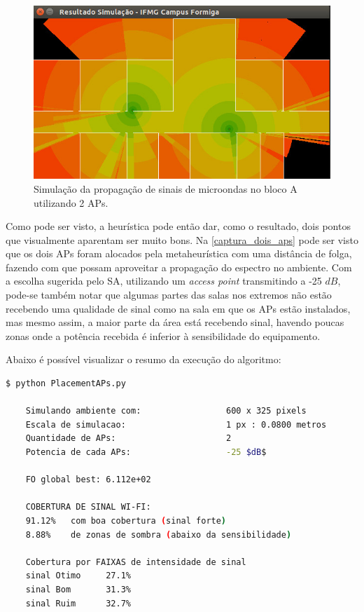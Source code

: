 \documentclass[
	12pt,				%
	twoside,			%
	a4paper,			%
	english,			%
	french,				%
	spanish,			%
	brazil				%
	]{abntex2}
\begin{document}
\begin{figure}[ht]
    \caption{\label{captura_dois_aps} Simulação da propagação de sinais de microondas no bloco A utilizando 2 APs.
    }
    \begin{center}
        \includegraphics[scale=0.6]{imagens/captura-2-aps-2.jpg}
    \end{center}
\end{figure}

Como pode ser visto, a heurística pode então dar, como o resultado, dois
pontos que visualmente aparentam ser muito bons. Na
\autoref{captura_dois_aps} pode ser visto que os dois APs foram alocados
pela metaheurística com uma distância de folga, fazendo com que possam
aproveitar a propagação do espectro no ambiente. Com a escolha sugerida
pelo SA, utilizando um \emph{access point} transmitindo a -25 \(dB\),
pode-se também notar que algumas partes das salas nos extremos não estão
recebendo uma qualidade de sinal como na sala em que os APs estão
instalados, mas mesmo assim, a maior parte da área está recebendo sinal,
havendo poucas zonas onde a potência recebida é inferior à sensibilidade
do equipamento.

Abaixo é possível visualizar o resumo da execução do algoritmo:

\begin{lstlisting}[language=bash]
    $ python PlacementAPs.py 
    
    Simulando ambiente com:                 600 x 325 pixels
    Escala de simulacao:                    1 px : 0.0800 metros
    Quantidade de APs:                      2
    Potencia de cada APs:                   -25 $dB$
    
    FO global best: 6.112e+02
    
    COBERTURA DE SINAL WI-FI:
    91.12%   com boa cobertura (sinal forte)
    8.88%    de zonas de sombra (abaixo da sensibilidade)
    
    Cobertura por FAIXAS de intensidade de sinal
    sinal Otimo     27.1%
    sinal Bom       31.3%
    sinal Ruim      32.7%
\end{lstlisting}
\end{document}
